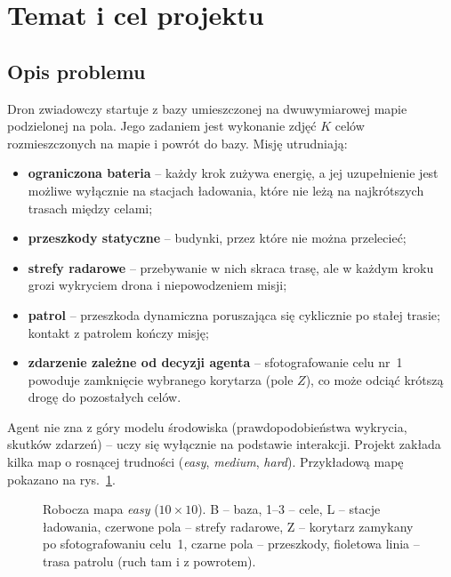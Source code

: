 \section{Temat i cel projektu}
\label{sec:temat}

\subsection{Opis problemu}
\label{sec:problem}

Dron zwiadowczy startuje z bazy umieszczonej na dwuwymiarowej mapie
podzielonej na pola. Jego zadaniem jest wykonanie zdjęć $K$ celów
rozmieszczonych na mapie i powrót do bazy. Misję utrudniają:

\begin{itemize}
  \item \textbf{ograniczona bateria} -- każdy krok zużywa energię, a jej
        uzupełnienie jest możliwe wyłącznie na stacjach ładowania, które nie
        leżą na najkrótszych trasach między celami;
  \item \textbf{przeszkody statyczne} -- budynki, przez które nie można przelecieć;
  \item \textbf{strefy radarowe} -- przebywanie w nich skraca trasę, ale w
        każdym kroku grozi wykryciem drona i niepowodzeniem misji;
  \item \textbf{patrol} -- przeszkoda dynamiczna poruszająca się cyklicznie
        po stałej trasie; kontakt z patrolem kończy misję;
  \item \textbf{zdarzenie zależne od decyzji agenta} -- sfotografowanie
        celu nr~1 powoduje zamknięcie wybranego korytarza (pole $Z$), co może
        odciąć krótszą drogę do pozostałych celów.
\end{itemize}

Agent nie zna z góry modelu środowiska (prawdopodobieństwa wykrycia, skutków
zdarzeń) -- uczy się wyłącznie na podstawie interakcji. Projekt zakłada kilka
map o rosnącej trudności (\emph{easy}, \emph{medium}, \emph{hard}).
Przykładową mapę pokazano na rys.~\ref{fig:map-easy}.

\begin{figure}[h]
  \centering
  
  \caption{Robocza mapa \emph{easy} ($10\times10$). B -- baza, 1--3 -- cele,
    L -- stacje ładowania, czerwone pola -- strefy radarowe, Z -- korytarz
    zamykany po sfotografowaniu celu~1, czarne pola -- przeszkody, fioletowa
    linia -- trasa patrolu (ruch tam i z powrotem).}
  \label{fig:map-easy}
\end{figure}

